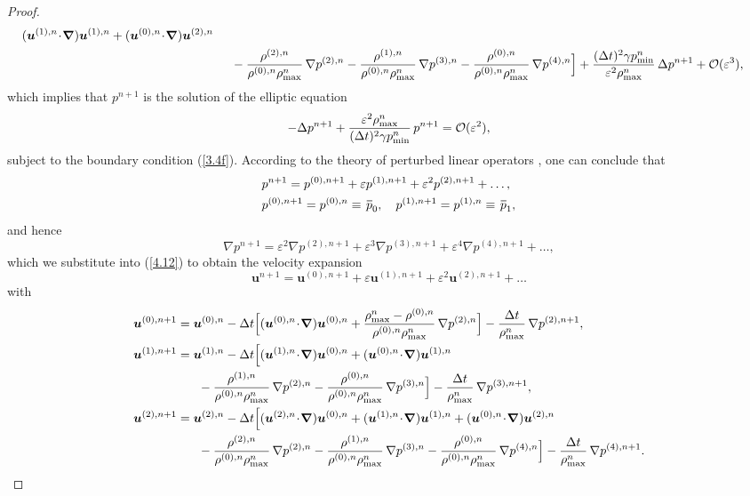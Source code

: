 \documentclass[preprint,12pt]{elsarticle}
\def\bnabla{\bm{\nabla}}
\newcommand{\dt}{\Delta t}
\newcommand{\ve}{\varepsilon}
\newcommand\eref[1]{(\ref{#1})}
\newcommand*\xbar[1]{%
	\hbox{%
		\vbox{%
			\hrule height 0.5pt %
			\kern0.4ex%
			\hbox{%
				\kern-0.05em%
				\ensuremath{#1}%
				\kern-0.00em%
			}%
		}%
	}%
}
\begin{document}
\begin{proof}
$$\begin{aligned}
		(\bm u^{(1),n}\!\cdot\!\bnabla)\bm u^{(1),n}+(\bm u^{(0),n}\!\cdot\!\bnabla)\bm u^{(2),n}\\
		&\hspace*{0.5cm}-\frac{\rho^{(2),n}}{\rho^{(0),n}\rho_{\max}^n}\,\nabla p^{(2),n}-
		\frac{\rho^{(1),n}}{\rho^{(0),n}\rho_{\max}^n}\,\nabla p^{(3),n}-\frac{\rho^{(0),n}}{\rho^{(0),n}\rho_{\max}^n}\,\nabla p^{(4),n}\Big]
		+\frac{(\dt)^2\gamma p_{\min}^n}{\ve^2 \rho_{\max}^n}\,\Delta p^{n+1}+{\cal O}(\ve^3),
	\end{aligned}
	$$
	which implies that $p^{n+1}$ is the solution of the elliptic equation
	$$
	-\Delta p^{n+1}+\frac{\ve^2\rho_{\max}^n}{(\dt)^2\gamma p_{\min}^n}\,p^{n+1}={\cal O}(\ve^2),
	$$
	subject to the boundary condition \eref{3.4f}. According to the theory of perturbed linear operators \cite{kato1966perturbation}, one can
	conclude that 
	\begin{align}
		&p^{n+1}=p^{(0),n+1}+\ve p^{(1),n+1}+\ve^2p^{(2),n+1}+\dots,\label{3.20f}\\
		&p^{(0),n+1}=p^{(0),n}\equiv\,\xbar p_0,\quad p^{(1),n+1}=p^{(1),n}\equiv\,\xbar p_1,\label{4.14}
	\end{align}
	and hence
	$$
	\nabla p^{n+1}=\ve^2\nabla p^{(2),n+1}+\ve^3\nabla p^{(3),n+1}+\ve^4\nabla p^{(4),n+1}+\dots,
	$$
	which we substitute into \eref{4.12} to obtain the velocity expansion
	$$
	\bm u^{n+1}=\bm u^{(0),n+1}+\ve\bm u^{(1),n+1}+\ve^2\bm u^{(2),n+1}+\dots
	$$
	with
	\begin{equation}
		\begin{aligned}
			\bm u^{(0),n+1}&=\bm u^{(0),n}-\dt\Big[(\bm u^{(0),n}\!\cdot\!\bnabla)\bm u^{(0),n}+
			\frac{\rho_{\max}^n-\rho^{(0),n}}{\rho^{(0),n}\rho_{\max}^n}\,\nabla p^{(2),n}\Big]-\frac{\dt}{\rho_{\max}^n}\,\nabla p^{(2),n+1},\\
			\bm u^{(1),n+1}&=\bm u^{(1),n}-\dt\Big[(\bm u^{(1),n}\!\cdot\!\bnabla)\bm u^{(0),n}+(\bm u^{(0),n}\!\cdot\!\bnabla)\bm u^{(1),n}\\
			&\hspace*{0.6cm}-\frac{\rho^{(1),n}}{\rho^{(0),n}\rho_{\max}^n}\,\nabla p^{(2),n}-
			\frac{\rho^{(0),n}}{\rho^{(0),n}\rho_{\max}^n}\,\nabla p^{(3),n}\Big]-\frac{\dt}{\rho_{\max}^n}\,\nabla p^{(3),n+1},\\
			\bm u^{(2),n+1}&=\bm u^{(2),n}-\dt\Big[(\bm u^{(2),n}\!\cdot\!\bnabla)\bm u^{(0),n}+(\bm u^{(1),n}\!\cdot\!\bnabla)\bm u^{(1),n}
			+(\bm u^{(0),n}\!\cdot\!\bnabla)\bm u^{(2),n}\\
			&\hspace*{0.6cm}-\frac{\rho^{(2),n}}{\rho^{(0),n}\rho_{\max}^n}\,\nabla p^{(2),n}
			-\frac{\rho^{(1),n}}{\rho^{(0),n}\rho_{\max}^n}\,\nabla p^{(3),n}-\frac{\rho^{(0),n}}{\rho^{(0),n}\rho_{\max}^n}\,\nabla p^{(4),n}\Big]-
			\frac{\dt}{\rho_{\max}^n}\,\nabla p^{(4),n+1}.
		\end{aligned}
		\label{3.22}
	\end{equation}
	

\end{proof}
\end{document}
